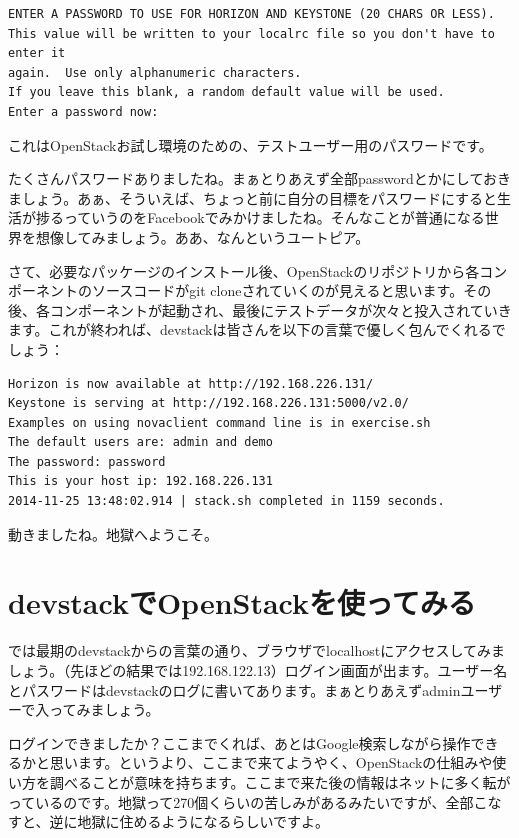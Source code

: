 \documentclass[9pt,b5paper,tombo,openany,dvipdfmx]{jsbook}
\begin{document}
\begin{lstlisting}
ENTER A PASSWORD TO USE FOR HORIZON AND KEYSTONE (20 CHARS OR LESS).
This value will be written to your localrc file so you don't have to enter it
again.  Use only alphanumeric characters.
If you leave this blank, a random default value will be used.
Enter a password now:
\end{lstlisting}

これはOpenStackお試し環境のための、テストユーザー用のパスワードです。

たくさんパスワードありましたね。まぁとりあえず全部passwordとかにしておきましょう。あぁ、そういえば、ちょっと前に自分の目標をパスワードにすると生活が捗るっていうのをFacebookでみかけましたね。そんなことが普通になる世界を想像してみましょう。ああ、なんというユートピア。

さて、必要なパッケージのインストール後、OpenStackのリポジトリから各コンポーネントのソースコードがgit cloneされていくのが見えると思います。その後、各コンポーネントが起動され、最後にテストデータが次々と投入されていきます。これが終われば、devstackは皆さんを以下の言葉で優しく包んでくれるでしょう：

\begin{lstlisting}
Horizon is now available at http://192.168.226.131/
Keystone is serving at http://192.168.226.131:5000/v2.0/
Examples on using novaclient command line is in exercise.sh
The default users are: admin and demo
The password: password
This is your host ip: 192.168.226.131
2014-11-25 13:48:02.914 | stack.sh completed in 1159 seconds.
\end{lstlisting}

動きましたね。地獄へようこそ。

\section{devstackでOpenStackを使ってみる}

では最期のdevstackからの言葉の通り、ブラウザでlocalhostにアクセスしてみましょう。（先ほどの結果では192.168.122.13）ログイン画面が出ます。ユーザー名とパスワードはdevstackのログに書いてあります。まぁとりあえずadminユーザーで入ってみましょう。

ログインできましたか？ここまでくれば、あとはGoogle検索しながら操作できるかと思います。というより、ここまで来てようやく、OpenStackの仕組みや使い方を調べることが意味を持ちます。ここまで来た後の情報はネットに多く転がっているのです。地獄って270個くらいの苦しみがあるみたいですが、全部こなすと、逆に地獄に住めるようになるらしいですよ。
\end{document}
